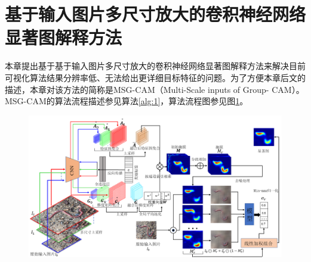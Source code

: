 \section{基于输入图片多尺寸放大的卷积神经网络显著图解释方法}
本章提出基于基于输入图片多尺寸放大的卷积神经网络显著图解释方法来解决目前可视化算法结果分辨率低、无法给出更详细目标特征的问题。为了方便本章后文的描述，本章对该方法的简称是MSG-CAM（Multi-Scale inputs of Group-
CAM）。MSG-CAM的算法流程描述参见算法\ref{alg:1}，算法流程图参见图\ref{fig:msg_pipeline}。

\begin{figure}[h]
	\centering 
	\includegraphics[width=15cm]{fig/ch3/msg_pipeline.png}
	\label{fig:msg_pipeline}
\end{figure}

